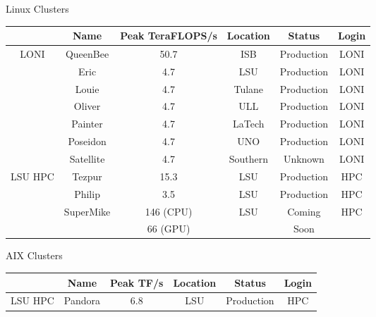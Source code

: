 \documentclass[slidestop,mathserif,compress,xcolor=svgnames,table]{beamer}
\begin{document}
\begin{frame}
\scriptsize{
\begin{block}{Linux Clusters}
\begin{center}
\begin{tabular}{|c|c|c|c|c|c|}
\hline
 & Name & Peak TeraFLOPS/s & Location & Status & Login\\
\hline
 \multirow{6}{*}{LONI} & QueenBee & 50.7 & ISB & Production & LONI \\
                                 & Eric & 4.7 & LSU & Production & LONI\\
                                 & Louie & 4.7 & Tulane & Production & LONI\\
                                 & Oliver & 4.7 & ULL & Production & LONI\\
                                 & Painter & 4.7 & LaTech & Production & LONI\\
                                 & Poseidon & 4.7 & UNO & Production & LONI\\
                                 & Satellite & 4.7 & Southern & Unknown & LONI\\
\hline
\multirow{4}{*}{ LSU HPC} & Tezpur & 15.3 & LSU & Production & HPC\\
                                       & Philip & 3.5 & LSU & Production & HPC\\
\cline{2-6}
                          & \multirow{2}{*}{SuperMike} & 146 (CPU) & \multirow{2}{*}{LSU} & Coming & \multirow{2}{*}{HPC} \\
                          &                            & 66 (GPU) & & Soon & \\
\hline
\end{tabular}
\end{center}
\end{block}
\begin{block}{AIX Clusters}
\begin{center}
\def\firstrowcolor{\rowcolor{green}}
\def\secondrowcolor{\rowcolor{blue!50}}
\def\thirdrowcolor{\rowcolor{tigerspurple!80}}
\begin{tabular}{|c|c|c|c|c|c|}
\hline
 & Name & Peak TF/s & Location & Status & Login\\
\hline
LSU HPC & Pandora & 6.8 & LSU & Production & HPC\\
\hline
\end{tabular}
\end{center}
\end{block}
}
\end{frame}
\end{document}
